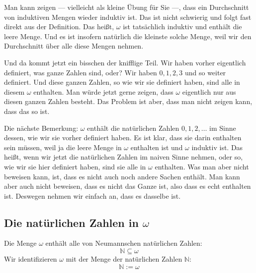 \begin{spoken-clean}[00:47:57 - 00:49:23]
Man kann zeigen --- vielleicht als kleine Übung für Sie ---, dass ein Durchschnitt von induktiven Mengen wieder induktiv ist. Das ist nicht schwierig und folgt fast direkt aus der Definition. Das heißt, $\omega$ ist tatsächlich induktiv und enthält die leere Menge. Und es ist insofern natürlich die kleinste solche Menge, weil wir den Durchschnitt über alle diese Mengen nehmen.
\end{spoken-clean}

\begin{spoken-clean}[00:49:23 - 00:51:19]
Und da kommt jetzt ein bisschen der knifflige Teil. Wir haben vorher eigentlich definiert, was ganze Zahlen sind, oder? Wir haben $0, 1, 2, 3$ und so weiter definiert. Und diese ganzen Zahlen, so wie wir sie definiert haben, sind alle in diesem $\omega$ enthalten. Man würde jetzt gerne zeigen, dass $\omega$ eigentlich nur aus diesen ganzen Zahlen besteht. Das Problem ist aber, dass man nicht zeigen kann, dass das so ist.

Die nächste Bemerkung: $\omega$ enthält die natürlichen Zahlen $0, 1, 2, \dots$ im Sinne dessen, wie wir sie vorher definiert haben. Es ist klar, dass sie darin enthalten sein müssen, weil ja die leere Menge in $\omega$ enthalten ist und $\omega$ induktiv ist. Das heißt, wenn wir jetzt die natürlichen Zahlen im naiven Sinne nehmen, oder so, wie wir sie hier definiert haben, sind sie alle in $\omega$ enthalten. Was man aber nicht beweisen kann, ist, dass es nicht auch noch andere Sachen enthält. Man kann aber auch nicht beweisen, dass es nicht das Ganze ist, also dass es echt enthalten ist. Deswegen nehmen wir einfach an, dass es dasselbe ist.
\end{spoken-clean}

\subsection{Die natürlichen Zahlen in \texorpdfstring{$\omega$}{omega}}
\begin{math-stroke}
\begin{remark}
Die Menge $\omega$ enthält alle von Neumannschen natürlichen Zahlen:
\[
\mathbb{N} \subseteq \omega
\]
Wir identifizieren $\omega$ mit der Menge der natürlichen Zahlen $\mathbb{N}$:
\[
\mathbb{N} := \omega
\]
\end{remark}
\end{math-stroke}

